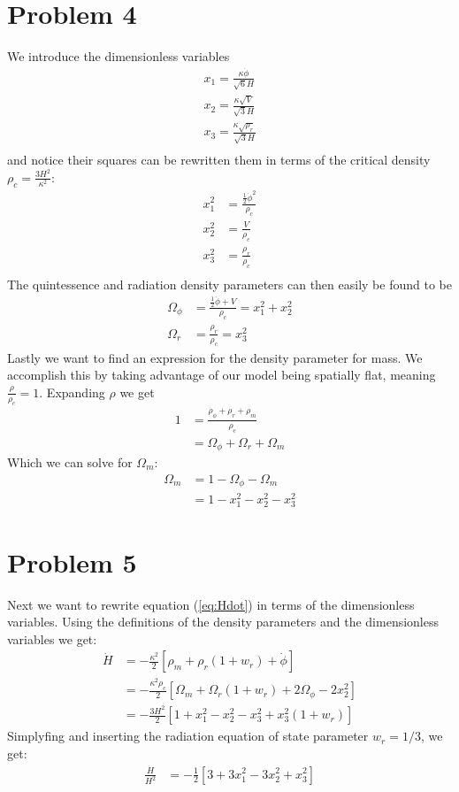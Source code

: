 \documentclass[reprint,english,notitlepage]{revtex4-1}  %
\begin{document}
\section{Problem 4}
We introduce the dimensionless variables
\begin{align}
	x_1 = \frac{\kappa \dot{\phi}}{\sqrt{6}H} \\
	x_2 = \frac{\kappa \sqrt{V}}{\sqrt{3}H} \\
	x_3 = \frac{\kappa \sqrt{\rho_r}}{\sqrt{3}H} \\
\end{align}
and notice their squares can be rewritten them in terms of the critical density
$\rho_c = \frac{3H^2}{\kappa^2}$:
\begin{align}
	x_1^2 &= \frac{\frac{1}{2}\dot{\phi}^2}{\rho_c} \label{eq:x1} \\
	x_2^2 &= \frac{V}{\rho_c} \label{eq:x2} \\
	x_3^2 &= \frac{\rho_r}{\rho_c} \label{eq:x3} \\
\end{align}
The quintessence and radiation density parameters can then easily be found to be
\begin{align}
	\Omega_\phi &= \frac{\frac{1}{2}\dot{\phi} + V}{\rho_c} = x_1^2 + x_2^2 \\
	\Omega_r &= \frac{\rho_r}{\rho_c} = x_3^2
\end{align}
Lastly we want to find an expression for the density parameter for
mass. We accomplish this by taking advantage of our model being
spatially flat, meaning $\frac{\rho}{\rho_c} = 1$. Expanding $\rho$
we get
\begin{align}
	1 &= \frac{\rho_\phi + \rho_r + \rho_m}{\rho_c} \\
		&= \Omega_\phi + \Omega_r + \Omega_m
\end{align}
Which we can solve for $\Omega_m$:
\begin{align}
	\Omega_m &= 1 - \Omega_\phi - \Omega_m \\
					 &= 1 - x_1^2 - x_2^2 - x_3^2
\end{align}

\section{Problem 5}
Next we want to rewrite equation (\ref{eq:Hdot}) in terms of the dimensionless
variables. Using the definitions of the density parameters and the dimensionless
variables we get:
\begin{align}
	\dot{H} &= -\frac{\kappa^2}{2} \left[ \rho_m + \rho_r(1+w_r) + \dot{\phi}\right] \\
					&= -\frac{\kappa^2 \rho_c}{2}\left[\Omega_m + \Omega_r(1+w_r) + 2\Omega_\phi -2x_2^2\right] \\
					&= -\frac{3H^2}{2}\left[1 + x_1^2 -x_2^2 -x_3^2 + x_3^2(1+w_r)\right]
\end{align}
Simplyfing and inserting the radiation equation of state parameter $w_r = 1/3$,
we get:
\begin{align}
	\frac{\dot{H}}{H^2} &= -\frac{1}{2}\left[3+3x_1^2 -3x_2^2 + x_3^2\right] \label{eq:H_dim}
\end{align}
\end{document}
